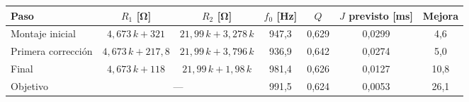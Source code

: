 \begin{tabular}{@{}lcccccc@{}}
\toprule
Paso & $R_1$ [\unit{\ohm}] & $R_2$ [\unit{\ohm}] & $f_0$ [\unit{\hertz}] & $Q$ & $J$ previsto [\unit{\milli\second}] & Mejora \\
\midrule
Montaje inicial & $4{,}673\,k + 321$ & $21{,}99\,k + 3{,}278\,k$ & 947{,}3 & 0{,}629 & 0{,}0299 & 4{,}6 \\
Primera corrección & $4{,}673\,k + 217{,}8$ & $21{,}99\,k + 3{,}796\,k$ & 936{,}9 & 0{,}642 & 0{,}0274 & 5{,}0 \\
Final & $4{,}673\,k + 118$ & $21{,}99\,k + 1{,}98\,k$ & 981{,}4 & 0{,}626 & 0{,}0127 & 10{,}8 \\
\midrule
Objetivo & \multicolumn{2}{c}{---} & 991{,}5 & 0{,}624 & 0{,}0053 & 26{,}1 \\
\bottomrule
\end{tabular}
